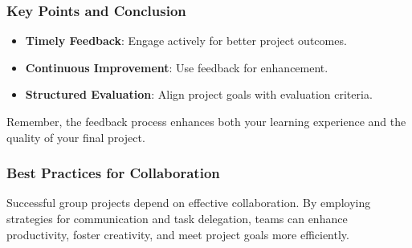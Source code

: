 \documentclass[aspectratio=169]{beamer}
\begin{document}
\begin{frame}[fragile]
    \frametitle{Key Points and Conclusion}
    \begin{itemize}
        \item \textbf{Timely Feedback}: Engage actively for better project outcomes.
        \item \textbf{Continuous Improvement}: Use feedback for enhancement.
        \item \textbf{Structured Evaluation}: Align project goals with evaluation criteria.
    \end{itemize}
    Remember, the feedback process enhances both your learning experience and the quality of your final project.
\end{frame}

\begin{frame}[fragile]
    \frametitle{Best Practices for Collaboration}
    Successful group projects depend on effective collaboration. By employing strategies for communication and task delegation, teams can enhance productivity, foster creativity, and meet project goals more efficiently.
\end{frame}
\end{document}

